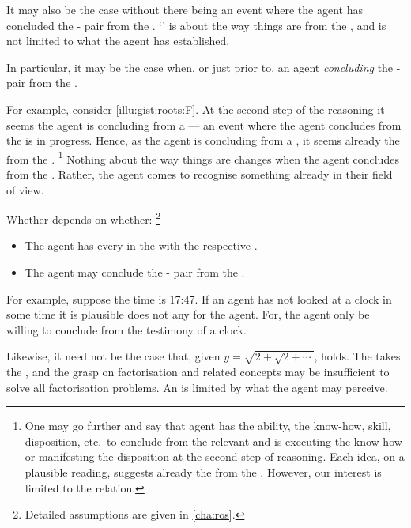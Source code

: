 \begin{note}
  It may also be the case  without there being an event where the agent has concluded the - pair from the \pool{}.
  `' is about the way things are from the \agpe{}, and is not limited to what the agent has established.

  In particular, it may be the case  when, or just prior to, an agent \emph{concluding} the - pair from the \pool{}.

  For example, consider \autoref{illu:gist:roots:F}.
  At the second step of the \agents{} reasoning it seems the agent is concluding  from a \pool{} --- an event where the agent concludes  from the \pool{} is in progress.
  Hence, as the agent is concluding  from a \pool{}, it seems  already \fof{} the \pool{} from the \agpe{}.%
  \footnote{
    One may go further and say that agent has the ability, the know-how, skill, disposition, etc.\ to conclude  from the relevant \pool{} and is executing the know-how or manifesting the disposition at the second step of reasoning.
    Each idea, on a plausible reading, suggests  already \fof{} the \pool{} from the \agpe{}.
    However, our interest is limited to the relation.
  }
  Nothing about the way things are changes when the agent concludes  from the \pool{}.
  Rather, the agent comes to recognise something already in their field of view.

  Whether  depends on whether:%
  \footnote{
    Detailed assumptions are given in \autoref{cha:ros}.
  }
  \begin{itemize}
  \item
    The agent has \evaled{} every  in the \pool{} with the respective .
  \item
    The agent may conclude the - pair from the \pool{}.
  \end{itemize}
  For example, suppose the time is 17:47.
  If an agent has not looked at a clock in some time it is plausible  does not  any \pool{} for the agent.
  For, the agent only be willing to conclude  from the testimony of a clock.

  Likewise, it need not be the case that, given \(y = \sqrt{ 2 + \sqrt{2 + \cdots}}\),  holds.
  The \fofr{} takes the \agpe{}, and the \agents{} grasp on factorisation and related concepts may be insufficient to solve all factorisation problems.
  An \agpe{} is limited by what the agent may perceive.
\end{note}


